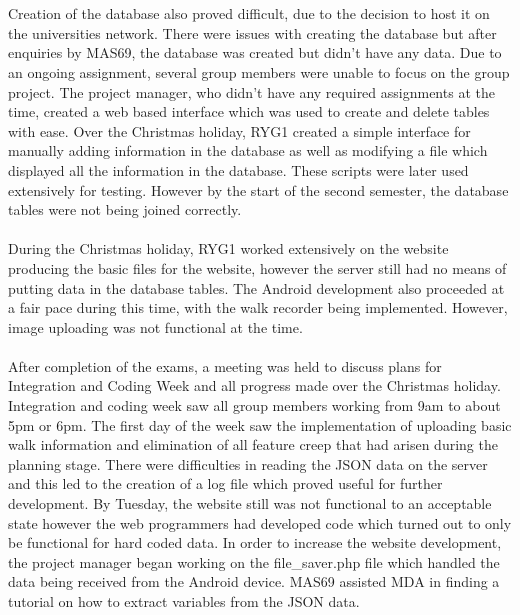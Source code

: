 \documentclass[12pt, portrait]{article}
\begin{document}
\\\\
Creation of the database also proved difficult, due to the decision to host it on the universities network. There were issues with creating the database but after enquiries by MAS69, the database was created but didn’t have any data. Due to an ongoing assignment, several group members were unable to focus on the group project. The project manager, who didn’t have any required assignments at the time, created a web based interface which was used to create and delete tables with ease. Over the Christmas holiday, RYG1 created a simple interface for manually adding information in the database as well as modifying a file which displayed all the information in the database. These scripts were later used extensively for testing. However by the start of the second semester, the database tables were not being joined correctly.
\\\\
During the Christmas holiday, RYG1 worked extensively on the website producing the basic files for the website, however the server still had no means of putting data in the database tables. The Android development also proceeded at a fair pace during this time, with the walk recorder being implemented. However, image uploading was not functional at the time. 
\\\\
After completion of the exams, a meeting was held to discuss plans for Integration and Coding Week and all progress made over the Christmas holiday. Integration and coding week saw all group members working from 9am to about 5pm or 6pm. The first day of the week saw the implementation of uploading basic walk information and elimination of all feature creep that had arisen during the planning stage. There were difficulties in reading the JSON data on the server and this led to the creation of a log file which proved useful for further development. By Tuesday, the website still was not functional to an acceptable state however the web programmers had developed code which turned out to only be functional for hard coded data. In order to increase the website development, the project manager began working on the file\_saver.php file which handled the data being received from the Android device. MAS69 assisted MDA in finding a tutorial on how to extract variables from the JSON data. 
\\\\
\end{document}
